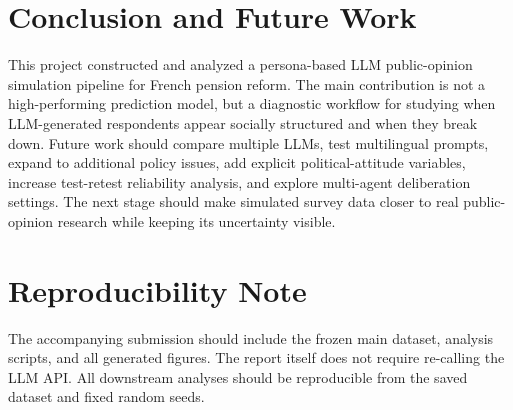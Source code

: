 ﻿\documentclass[10pt,twocolumn]{article}
\begin{document}
\section{Conclusion and Future Work}
This project constructed and analyzed a persona-based LLM public-opinion simulation pipeline for French pension reform. The main contribution is not a high-performing prediction model, but a diagnostic workflow for studying when LLM-generated respondents appear socially structured and when they break down. Future work should compare multiple LLMs, test multilingual prompts, expand to additional policy issues, add explicit political-attitude variables, increase test-retest reliability analysis, and explore multi-agent deliberation settings. The next stage should make simulated survey data closer to real public-opinion research while keeping its uncertainty visible.

\section*{Reproducibility Note}
The accompanying submission should include the frozen main dataset, analysis scripts, and all generated figures. The report itself does not require re-calling the LLM API. All downstream analyses should be reproducible from the saved dataset and fixed random seeds.



\end{document}
